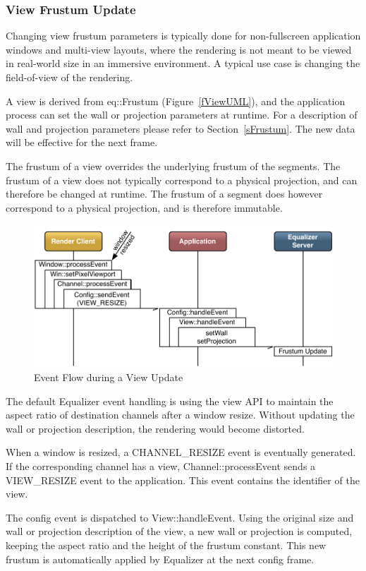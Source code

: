 \documentclass[10pt,a4]{scrartcl}
\newcommand{\fig}[1]{Figure~\ref{#1}}
\newcommand{\sref}[1]{Section~\ref{#1}}
\begin{document}
\subsubsection{View Frustum Update}

Changing view frustum parameters is typically done for non-fullscreen
application windows and multi-view layouts, where the rendering is not
meant to be viewed in real-world size in an immersive environment. A
typical use case is changing the field-of-view of the rendering.

A view is derived from \textsf{eq::Frustum} (\fig{fViewUML}), and the
application process can set the wall or projection parameters at
runtime. For a description of wall and projection parameters please refer
to \sref{sFrustum}. The new data will be effective for the next frame.

The frustum of a view overrides the underlying frustum of the
segments. The frustum of a view does not typically correspond to a
physical projection, and can therefore be changed at runtime. The
frustum of a segment does however correspond to a physical projection,
and is therefore immutable.

\begin{figure}
  \includegraphics[width=.618\textwidth]{images/viewUpdate.pdf}
  {\caption{\label{fViewUpdate}Event Flow during a View Update}}
\end{figure}
The default Equalizer event handling is using the view API to maintain
the aspect ratio of destination channels after a window resize. Without
updating the wall or projection description, the rendering would become
distorted.

When a window is resized, a \textsf{CHANNEL\_RESIZE} event is eventually
generated. If the corresponding channel has a view,
\textsf{Channel::processEvent} sends a \textsf{VIEW\_RESIZE} event to
the application. This event contains the identifier of the view. 

The config event is dispatched to \textsf{View::handleEvent}. Using the original
size and wall or projection description of the view, a new wall or projection is
computed, keeping the aspect ratio and the height of the frustum constant. This
new frustum is automatically applied by Equalizer at the next config frame.
\end{document}
